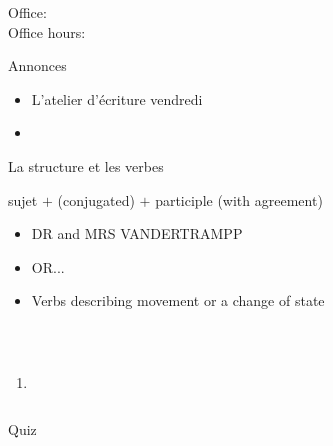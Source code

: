 \documentclass{beamer}
\subtitle[]{Le passé composé avec \lexi{être} et plus d'aliments}
\begin{document}
  \begin{frame}
    \titlepage
    \tiny{Office: \\
          Office hours: }
  \end{frame}

  \begin{frame}{Annonces}
    \begin{itemize}
      \item L'atelier d'écriture vendredi
      \item[] 
    \end{itemize}
  \end{frame}

  \begin{frame}{La structure et les verbes}
    \begin{center}
      sujet $+$  (conjugated) $+$ participle (with agreement)
    \end{center}
    \begin{itemize}
      \item DR and MRS VANDERTRAMPP
      \item[] OR...
      \item Verbs describing movement or a change of state
    \end{itemize}
  \end{frame}

  \begin{frame}{}
     \\
    \tinygloss{}
    \begin{columns}
        \begin{enumerate}
          \item
        \end{enumerate}
        \begin{minipage}[c][0.6\textheight]{\linewidth}
          \begin{center}
          \end{center}
        \end{minipage}
    \end{columns}
  \end{frame}

  \begin{frame}{}
    \begin{center}
      \Large Quiz
    \end{center}
  \end{frame}
\end{document}
